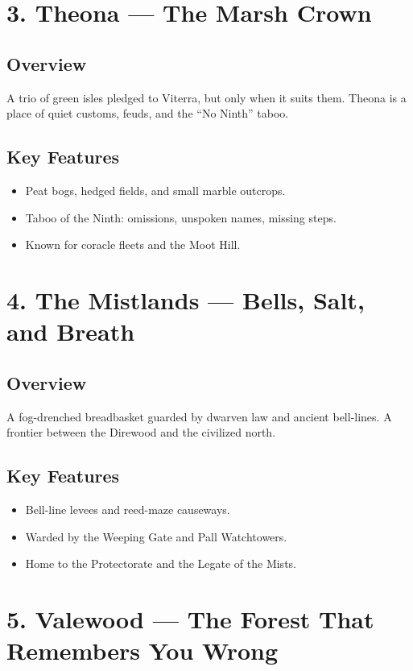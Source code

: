 \documentclass[11pt]{article}
\begin{document}
\section*{3. Theona — The Marsh Crown}

\subsection*{Overview}
A trio of green isles pledged to Viterra, but only when it suits them. Theona is a place of quiet customs, feuds, and the ``No Ninth'' taboo.

\subsection*{Key Features}
\begin{itemize}[leftmargin=*]
    \item Peat bogs, hedged fields, and small marble outcrops.
    \item Taboo of the Ninth: omissions, unspoken names, missing steps.
    \item Known for coracle fleets and the Moot Hill.
\end{itemize}

\section*{4. The Mistlands — Bells, Salt, and Breath}

\subsection*{Overview}
A fog-drenched breadbasket guarded by dwarven law and ancient bell-lines. A frontier between the Direwood and the civilized north.

\subsection*{Key Features}
\begin{itemize}[leftmargin=*]
    \item Bell-line levees and reed-maze causeways.
    \item Warded by the Weeping Gate and Pall Watchtowers.
    \item Home to the Protectorate and the Legate of the Mists.
\end{itemize}

\section*{5. Valewood — The Forest That Remembers You Wrong}
\end{document}
